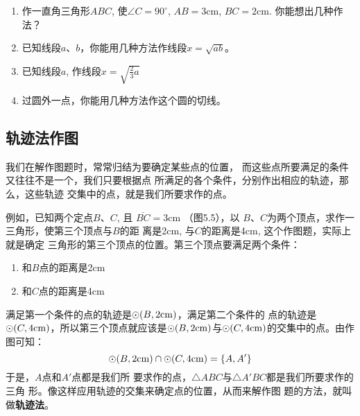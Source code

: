 \begin{ex}
\begin{enumerate}
    \item 作一直角三角形$ABC$, 使$\angle C=90^{\circ}$, $AB=3$cm, $BC=
    2$cm. 你能想出几种作法？
    \item 已知线段$a$、$b$，你能用几种方法作线段$x=\sqrt{ab}$。
    \item 已知线段$a$, 作线段$x=\sqrt{\frac{2}{3}a}$
        \item 过圆外一点，你能用几种方法作这个圆的切线。
\end{enumerate}
\end{ex}

\subsection{轨迹法作图}
我们在解作图题时，常常归结为要确定某些点的位置，
而这些点所要满足的条件又往往不是一个，我们只要根据点
所满足的各个条件，分别作出相应的轨迹，那么，这些轨迹
交集中的点，就是我们所要求作的点。

例如，已知两个定点$B$、$C$, 且
$\overline{BC}=3$cm （图5.5），以
$B$、$C$为两个顶点，求作一三角形，使第三个顶点与$B$的距
离是2cm, 与$C$的距离是4cm, 这个作图题，实际上就是确定
三角形的第三个顶点的位置。第三个顶点要满足两个条件：
\begin{enumerate}
    \item 和$B$点的距离是2cm
    \item 和$C$点的距离是4cm
\end{enumerate}
满足第一个条件的点的轨迹是$\odot(B,2{\rm cm})$，满足第二个条件的
点的轨迹是$\odot (C,4{\rm cm})$，所以第三个顶点就应该是$\odot(B,2{\rm cm})$与$\odot (C,4{\rm cm})$的交集中的点。由作图可知：
\[\odot(B,2{\rm cm})\cap \odot (C,4{\rm cm})=\{A, A'\}\]
于是，$A$点和$A'$点都是我们所
要求作的点，$\triangle ABC$与$\triangle A'BC$都是我们所要求作的三角
形。像这样应用轨迹的交集来确定点的位置，从而来解作图
题的方法，就叫做\textbf{轨迹法}。








































































